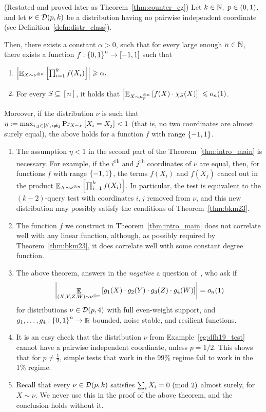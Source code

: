 \begin{theorem}\label{thm:intro_main} (Restated and proved later as Theorem~\ref{thm:counter_eg})
	Let $k\in \mathbb{N},\ p\in (0,1)$, and let $\nu \in \mathcal D(p,k)$ be a distribution having no pairwise independent coordinate (see Definition~\ref{defn:distr_class}).
	
	Then, there exists a constant $\alpha>0$, such that for every large enough $n\in \mathbb{N}$, there exists a function $f:\left\{ 0,1 \right\}^n \to [-1,1]$ such that 
	\begin{enumerate}
		\item $\left|\mathop{\mathbb{E}}_{X\sim \nu^{\otimes n}} \left[ \prod_{i=1}^k f(X_i) \right] \right|\geqslant \alpha.$
		\item For every $S\subseteq [n]$, it holds that $ \left|\mathop{\mathbb{E}}_{X\sim \mu_p^{\otimes n}}\left[ f(X)\cdot \chi_S(X) \right]\right| \leqslant o_n(1)$.
	\end{enumerate}
	
	Moreover, if the distribution $\nu$ is such that $\eta:= \max_{i,j\in [k], i\not= j} \Pr_{X\sim \nu}\left[ X_i=X_j \right] < 1$ (that is, no two coordinates are almost surely equal), the above holds for a function $f$ with range $\left\{ -1,1 \right\}$.
\end{theorem}

\begin{remark}
\hfill
\begin{enumerate}
	\item The assumption $\eta < 1$ in the second part of the Theorem~\ref{thm:intro_main} is necessary.
	For example, if the $i$\textsuperscript{th} and $j$\textsuperscript{th} coordinates of $\nu$ are equal, then, for functions $f$ with range $\left\{ -1,1 \right\}$, the terms $f(X_i)$ and $f(X_j)$ cancel out in the product $\mathop{\mathbb{E}}_{X\sim \nu^{\otimes n}} \left[ \prod_{i=1}^k f(X_i) \right]$.
	In particular, the test is equivalent to the $(k-2)$-query test with coordinates $i,j$ removed from $\nu$, and this new distribution may possibly satisfy the conditions of Theorem~\ref{thm:bkm23}.
	\item The function $f$ we construct in Theorem~\ref{thm:intro_main}  does not correlate well with any linear function, although, as possibly required by Theorem~\ref{thm:bkm23}, it does correlate well with some constant degree function.
	\item The above theorem, answers in the \emph{negative} a question of~\cite{BKM23b}, who ask if \[\left|\mathop{\mathbb{E}}_{(X,Y,Z,W)\sim \nu^{\otimes n}}\left[ g_1(X)\cdot g_2(Y)\cdot g_3(Z)\cdot g_4(W) \right]\right| = o_n(1)\] for distributions $\nu\in \mathcal D(p,4)$ with full even-weight support, and $g_1,\dots,g_4:\left\{ 0,1 \right\}^n\to \mathop{\mathbb{R}}$ bounded, noise stable, and resilient functions.
	\item It is an easy check that the distribution $\nu$ from Example~\ref{eg:dfh19_test} cannot have a pairwise independent coordinate, unless $p=1/2$. This shows that for $p\not=\frac{1}{2}$, simple tests that work in the 99\% regime fail to work in the 1\% regime.
	\item Recall that every $\nu\in\mathcal D(p,k)$ satisfies $\sum_i X_i=0 \textnormal{ (mod 2)}$ almost surely, for $X\sim \nu$. We never use this in the proof of the above theorem, and the conclusion holds without it.
\end{enumerate}
\end{remark}

